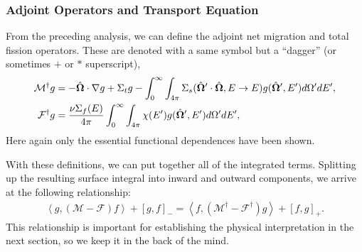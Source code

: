 \subsubsection{Adjoint Operators and Transport Equation}

From the preceding analysis, we can define the adjoint net migration and total fission operators. These are denoted with a same symbol but a ``dagger'' (or sometimes $+$ or $*$ superscript),
\begin{subequations}
\begin{align}  
  \mathcal{M}^\dagger g &= -\hat{\mathbf{\Omega}} \cdot \nabla g + \Sigma_t g - \int_0^\infty \int_{4\pi} \Sigma_s(\hat{\mathbf{\Omega}}' \cdot \hat{\mathbf{\Omega}} , E \rightarrow E ) g(\hat{\mathbf{\Omega}}',E') d\Omega' dE', \\
  \mathcal{F}^\dagger g &= \frac{\nu\Sigma_f(E)}{4\pi} \int_0^\infty \int_{4\pi} \chi(E') g(\hat{\mathbf{\Omega}}',E') d\Omega' dE',
\end{align}
\end{subequations}
Here again only the essential functional dependences have been shown. 

With these definitions, we can put together all of the integrated terms. Splitting up the resulting surface integral into inward and outward components, we arrive at the following relationship:
\begin{align}
  \left< g, ( \mathcal{M} - \mathcal{F} ) f \right> + \left[ g, f \right]_- = \left< f, ( \mathcal{M}^\dagger - \mathcal{F}^\dagger ) g \right> + \left[ f, g \right]_+ . \label{Eq:kinetics_adjointInnerProductRelation}
\end{align}
This relationship is important for establishing the physical interpretation in the next section, so we keep it in the back of the mind.


